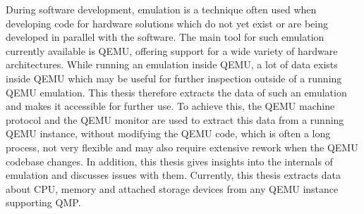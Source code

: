 
\Abstract
During software development, emulation is a technique often used when developing code for hardware solutions which do not yet exist
or are being developed in parallel with the software.
The main tool for such emulation currently available is QEMU, offering support for a wide variety of hardware architectures.
While running an emulation inside QEMU,
a lot of data exists inside QEMU which may be useful for further inspection outside of a running QEMU emulation.
This thesis therefore extracts the data of such an emulation and makes it accessible for further use.
To achieve this, the QEMU machine protocol and the QEMU monitor are used to extract this data from a running QEMU instance,
without modifying the QEMU code, which is often a long process,
not very flexible and may also require extensive rework when the QEMU codebase changes.
In addition, this thesis gives insights into the internals of emulation and discusses issues with them.
Currently, this thesis extracts data about CPU, memory and attached storage devices from any QEMU instance supporting QMP.